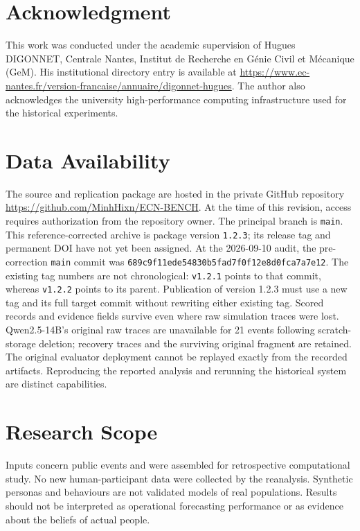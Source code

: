 \documentclass[10pt,conference]{IEEEtran}
\begin{document}

\section*{Acknowledgment}
This work was conducted under the academic supervision of Hugues DIGONNET,
Centrale Nantes, Institut de Recherche en G\'enie Civil et M\'ecanique (GeM).
His institutional directory entry is available at
\url{https://www.ec-nantes.fr/version-francaise/annuaire/digonnet-hugues}.
The author also acknowledges the university high-performance computing
infrastructure used for the historical experiments.

\section*{Data Availability}
The source and replication package are hosted in the private GitHub repository
\url{https://github.com/MinhHixn/ECN-BENCH}. At the time of this revision,
access requires authorization from the repository owner. The principal branch
is \texttt{main}. This reference-corrected archive is package version
\texttt{1.2.3}; its release tag and permanent DOI have not yet been assigned.
At the 2026-09-10 audit, the pre-correction \texttt{main} commit was
\nolinkurl{689c9f11ede54830b5fad7f0f12e8d0fca7a7e12}. The existing tag numbers
are not chronological: \texttt{v1.2.1} points to that commit, whereas
\texttt{v1.2.2} points to its parent. Publication of version 1.2.3 must use a
new tag and its full target commit without rewriting either existing tag.
Scored records and evidence fields survive even where raw simulation traces
were lost. Qwen2.5-14B's original raw traces are unavailable for 21 events
following scratch-storage deletion; recovery traces and the surviving original
fragment are retained. The original evaluator deployment cannot be replayed
exactly from the recorded artifacts. Reproducing the reported analysis and
rerunning the historical system are distinct capabilities.

\section*{Research Scope}
Inputs concern public events and were assembled for retrospective computational
study. No new human-participant data were collected by the reanalysis.
Synthetic personas and behaviours are not validated models of real populations.
Results should not be interpreted as operational forecasting performance
or as evidence about the beliefs of actual people.



\end{document}
